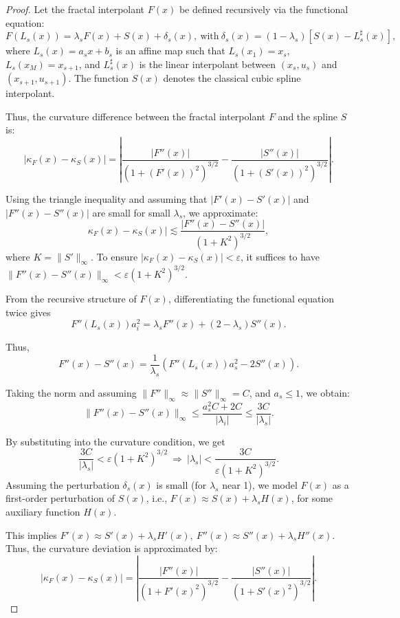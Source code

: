 \documentclass[runningheads]{llncs}
\begin{document}
	\begin{proof}
		Let the fractal interpolant $ F(x) $ be defined recursively via the functional equation:
		$$ F(L_s(x)) = \lambda_s F(x) + S(x) + \delta_s(x), \ \text{with} \ \delta_s(x) = (1 - \lambda_s)[S(x) - L_s^\sharp(x)],$$ where $ L_s(x) = a_s x + b_s $ is an affine map such that $ L_s(x_1) = x_s $, $ L_s(x_M) = x_{s+1} $, and $ L_s^\sharp(x) $ is the linear interpolant between $ (x_s, u_s) $ and $ (x_{s+1}, u_{s+1}) $. The function $ S(x) $ denotes the classical cubic spline interpolant.
		
		Thus, the curvature difference between the fractal interpolant $ F $ and the spline $ S $ is:
		$$ |\kappa_F(x) - \kappa_S(x)| = \left| \frac{|F''(x)|}{(1 + (F'(x))^2)^{3/2}} - \frac{|S''(x)|}{(1 + (S'(x))^2)^{3/2}} \right|.$$
		
		Using the triangle inequality and assuming that $ |F'(x) - S'(x)| $ and $ |F''(x) - S''(x)| $ are small for small $ \lambda_s $, we approximate: $$ \kappa_F(x) - \kappa_S(x)| \lesssim \frac{|F''(x) - S''(x)|}{(1 + K^2)^{3/2}},$$ where $ K = \|S'\|_\infty $. To ensure $|\kappa_F(x) - \kappa_S(x)| < \varepsilon$, it suffices to have $\|F''(x) - S''(x)\|_\infty < \varepsilon (1 + K^2)^{3/2}$. 
		
		From the recursive structure of $ F(x) $, differentiating the functional equation twice gives $$
		F''(L_s(x)) a_i^2 = \lambda_s F''(x) + (2 - \lambda_s) S''(x).$$ 
		
		Thus, $$ F''(x) - S''(x) = \frac{1}{\lambda_s} \left( F''(L_s(x)) a_s^2 - 2 S''(x) \right).$$
		
		Taking the norm and assuming $ \|F''\|_\infty \approx \|S''\|_\infty = C $, and $ a_s \leq 1 $, we obtain:
		$$\|F''(x) - S''(x)\|_\infty \leq \frac{a_s^2 C + 2C}{|\lambda_i|} \leq \frac{3C}{|\lambda_s|}.$$
		
		By substituting into the curvature condition, we get $$ \frac{3C}{|\lambda_s|} < \varepsilon (1 + K^2)^{3/2} \ \Rightarrow \ |\lambda_s| < \frac{3C}{\varepsilon (1 + K^2)^{3/2}}.	$$ Assuming the perturbation $ \delta_s(x) $ is small (for $ \lambda_s $ near 1), we model $ F(x) $ as a first-order perturbation of $ S(x) $, i.e., $ F(x) \approx S(x) + \lambda_s H(x)$, for some auxiliary function $ H(x) $. 
		
		This implies $ F'(x) \approx S'(x) + \lambda_s H'(x), \ F''(x) \approx S''(x) + \lambda_s H''(x)$. Thus, the curvature deviation is approximated by: $$ |\kappa_F(x) - \kappa_S(x)| = \left| \frac{|F''(x)|}{(1 + F'(x)^2)^{3/2}} - \frac{|S''(x)|}{(1 + S'(x)^2)^{3/2}} \right|. $$
		

\end{proof}
\end{document}
